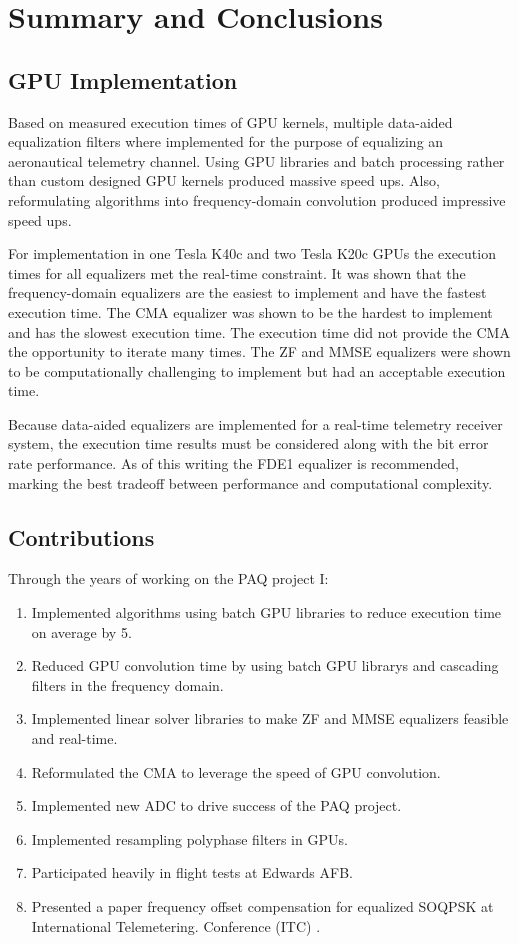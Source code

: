 \chapter{Summary and Conclusions}
\label{chap:final_summary}
\section{GPU Implementation}
Based on measured execution times of GPU kernels, multiple data-aided equalization filters where implemented for the purpose of equalizing an aeronautical telemetry channel.
Using GPU libraries and batch processing rather than custom designed GPU kernels produced massive speed ups.
Also, reformulating algorithms into frequency-domain convolution produced impressive speed ups.

For implementation in one Tesla K40c and two Tesla K20c GPUs the execution times for all equalizers met the real-time constraint.
It was shown that the frequency-domain equalizers are the easiest to implement and have the fastest execution time.
The CMA equalizer was shown to be the hardest to implement and has the slowest execution time.
The execution time did not provide the CMA the opportunity to iterate many times.
The ZF and MMSE equalizers were shown to be computationally challenging to implement but had an acceptable execution time.

Because data-aided equalizers are implemented for a real-time telemetry receiver system,
the execution time results must be considered along with the bit error rate performance.
As of this writing the FDE1 equalizer is recommended, marking the best tradeoff between performance and computational complexity.

\section{Contributions}
Through the years of working on the PAQ project I:
\begin{enumerate}
\item Implemented algorithms using batch GPU libraries to reduce execution time on average by 5.
\item Reduced GPU convolution time by using batch GPU librarys and cascading filters in the frequency domain.
\item Implemented linear solver libraries to make ZF and MMSE equalizers feasible and real-time.
\item Reformulated the CMA to leverage the speed of GPU convolution.
\item Implemented new ADC to drive success of the PAQ project.
\item Implemented resampling polyphase filters in GPUs.
\item Participated heavily in flight tests at Edwards AFB.
\item Presented a paper frequency offset compensation for equalized SOQPSK at International \newline Telemetering. Conference (ITC) \cite{ravert2016}.
\end{enumerate}

